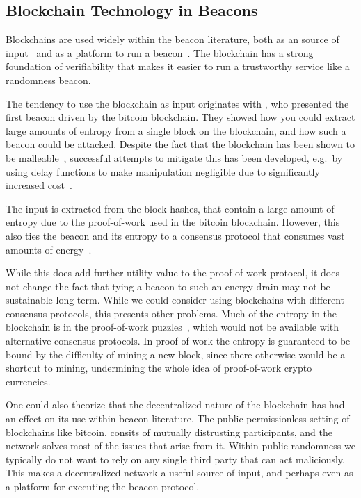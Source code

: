 \subsection{Blockchain Technology in Beacons}

Blockchains are used widely within the beacon literature, both as an source of input~\cite{bonneau2015bitcoin, bentov2016bitcoin, bunz2017proofsof} and as a platform to run a beacon~\cite{randao, bunz2017proofsof}.
The blockchain has a strong foundation of verifiability that makes it easier to run a trustworthy service like a randomness beacon.

The tendency to use the blockchain as input originates with \citet{bonneau2015bitcoin}, who presented the first beacon driven by the bitcoin blockchain.
They showed how you could extract large amounts of entropy from a single block on the blockchain, and how such a beacon could be attacked.
Despite the fact that the blockchain has been shown to be malleable~\cite{pierrot2016malleability}, successful attempts to mitigate this has been developed, e.g.\ by using delay functions to make manipulation negligible due to significantly increased cost~\cite{bunz2017proofsof}.

The input is extracted from the block hashes, that contain a large amount of entropy due to the proof-of-work used in the bitcoin blockchain.
However, this also ties the beacon and its entropy to a consensus protocol that consumes vast amounts of energy~\cite{bitcoinenergy}.

While this does add further utility value to the proof-of-work protocol, it does not change the fact that tying a beacon to such an energy drain may not be sustainable long-term.
While we could consider using blockchains with different consensus protocols, this presents other problems.
Much of the entropy in the blockchain is in the proof-of-work puzzles~\cite{bonneau2015bitcoin}, which would not be available with alternative consensus protocols.
In proof-of-work the entropy is guaranteed to be bound by the difficulty of mining a new block, since there otherwise would be a shortcut to mining, undermining the whole idea of proof-of-work crypto currencies.

One could also theorize that the decentralized nature of the blockchain has had an effect on its use within beacon literature.
The public permissionless setting of blockchains like bitcoin, consits of mutually distrusting participants, and the network solves most of the issues that arise from it.
Within public randomness we typically do not want to rely on any single third party that can act maliciously. This makes a decentralized network a useful source of input, and perhaps even as a platform for executing the beacon protocol.

